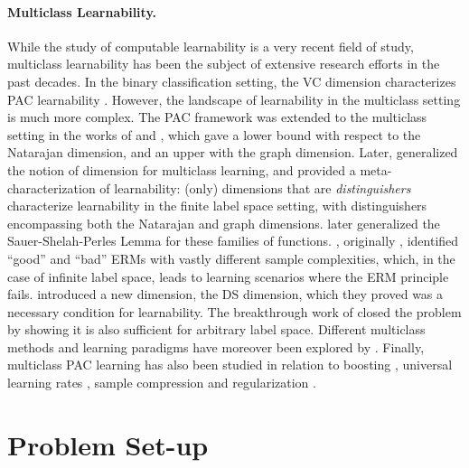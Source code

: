 \documentclass[11pt]{article}
\begin{document}
\paragraph{Multiclass Learnability.}
While the study of computable learnability is a very recent field of study, multiclass learnability has been the subject of extensive research efforts in the past decades.
In the binary classification setting, the VC dimension characterizes PAC learnability \citep{vapnik1971uniform,ehrenfeucht1989general,blumer1989learnability}.
However, the landscape of learnability in the multiclass setting is much more complex.
The PAC framework was extended to the multiclass setting in the works of \cite{natarajan1988two} and \cite{natarajan1989learning}, which gave a lower bound with respect to the Natarajan dimension, and an upper with the graph dimension.
Later, \cite{ben1992characterizations} generalized the notion of dimension for multiclass learning, and provided a meta-characterization of learnability: (only) dimensions that are \emph{distinguishers} characterize learnability in the finite label space setting, with distinguishers encompassing both the Natarajan and graph dimensions.
\cite{haussler1995generalization} later generalized the Sauer-Shelah-Perles Lemma for these families of functions.
\cite{daniely2015multiclass}, originally \citep{daniely2011multiclass}, identified ``good'' and ``bad'' ERMs with vastly different sample complexities, which, in the case of infinite label space, leads to learning scenarios where the ERM principle fails.
\cite{daniely2014optimal} introduced a new dimension, the DS dimension, which they proved was a necessary condition for learnability. 
The breakthrough work of \cite{brukhim2022characterization} closed the problem by showing it is also sufficient for arbitrary label space.
Different multiclass methods and learning paradigms have moreover been explored by \cite{daniely2012multiclass,rubinstein2006shifting,daniely2015inapproximability}.
Finally, multiclass PAC learning has also been studied in relation to boosting \citep{brukhim2021multiclass,brukhim2023improper,brukhim2024multiclass}, universal learning rates \citep{kalavasis2022multiclass,hanneke2023universal}, sample compression  \citep{pabbaraju2024multiclass} and regularization \citep{asilis2024regularization}.

\section{Problem Set-up}
\end{document}
